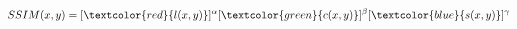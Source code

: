 \documentclass[preview]{standalone}
\begin{document}
\begin{align*}
SSIM(x,y) = [\textcolor{red}{l(x,y)}]^{\alpha}[\textcolor{green}{c(x,y)}]^{\beta}[\textcolor{blue}{s(x,y)}]^{\gamma}
\end{align*}
\end{document}
